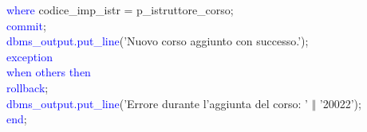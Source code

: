 \documentclass{article}
\begin{document}
\begin{flushleft}
{        \hspace*{4em}\textcolor{blue}{where} codice\_imp\_istr = p\_istruttore\_corso; \\
        \hspace*{4em}\textcolor{blue}{commit}; \\
        \hspace*{4em}\textcolor{blue}{dbms\_output.put\_line}('Nuovo corso aggiunto con successo.'); \\
        \hspace*{2em}\textcolor{blue}{exception} \\ 
        \hspace*{4em}\textcolor{blue}{when others then} \\
        \hspace*{6em}\textcolor{blue}{rollback}; \\
        \hspace*{6em}\textcolor{blue}{dbms\_output.put\_line}('Errore durante l'aggiunta del corso: ' $\Vert$ \hspace*{6em}'20022'); \\
        \hspace*{2em}\textcolor{blue}{end};} \\
    \end{flushleft}
\end{document}
